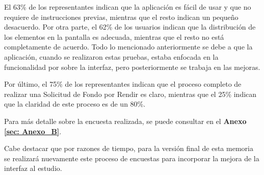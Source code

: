 El 63\% de los representantes indican que la aplicación es fácil de usar y que no requiere de instrucciones previas, mientras que el resto indican un pequeño desacuerdo. Por otra parte, el 62\% de los usuarios indican que la distribución de los elementos en la pantalla es adecuada, mientras que el resto no está completamente de acuerdo. Todo lo mencionado anteriormente se debe a que la aplicación, cuando se realizaron estas pruebas, estaba enfocada en la funcionalidad por sobre la interfaz, pero posteriormente se trabaja en las mejoras.

Por último, el 75\% de los representantes indican que el proceso completo de realizar una Solicitud de Fondo por Rendir es claro, mientras que el 25\% indican que la claridad de este proceso es de un 80\%.

Para más detalle sobre la encuesta realizada, se puede consultar en el \textbf{Anexo \ref{sec: Anexo_B}}.

Cabe destacar que por razones de tiempo, para la versión final de esta memoria se realizará nuevamente este proceso de encuestas para incorporar la mejora de la interfaz al estudio.